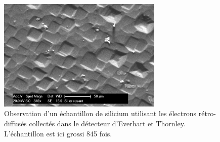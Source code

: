 \documentclass[a4paper,12pt]{article}
\newcommand\ett{Everhart et Thornley\xspace}
\begin{document}
\begin{figure}
\centering
\includegraphics[width=0.7\textwidth]{images/si_er_rasant.png}
\caption{Observation d'un échantillon de silicium utilisant les électrons rétro-diffusés collectés dans le détecteur d'\ett. L'échantillon est ici grossi 845 fois.}
\label{fig:si_er_rasant}
\end{figure}
\end{document}
